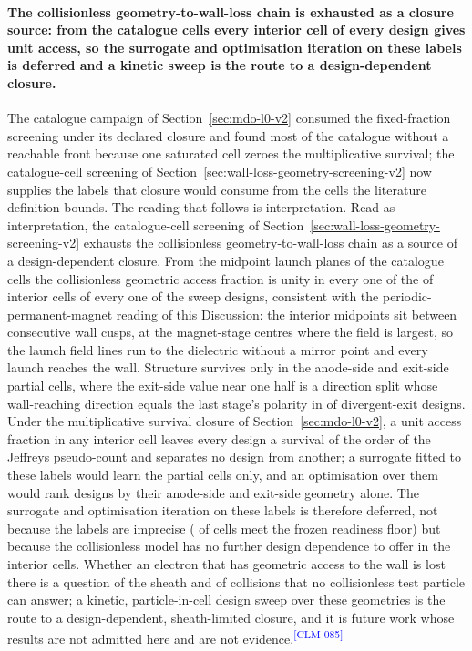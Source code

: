 \documentclass[11pt]{article}
\newcommand{\EvidenceClaim}[2]{#2\textsuperscript{\textcolor{blue}{[#1]}}}
\begin{document}
\paragraph{The collisionless geometry-to-wall-loss chain is exhausted as a
closure source: from the catalogue cells every interior cell of every design
gives unit access, so the surrogate and optimisation iteration on these labels is
deferred and a kinetic sweep is the route to a design-dependent closure.}
The catalogue campaign of Section~\ref{sec:mdo-l0-v2} consumed the fixed-fraction
screening under its declared closure and found most of the catalogue without a
reachable front because one saturated cell zeroes the multiplicative survival;
the catalogue-cell screening of Section~\ref{sec:wall-loss-geometry-screening-v2}
now supplies the labels that closure would consume from the cells the literature
definition bounds. The reading that follows is interpretation.
\EvidenceClaim{CLM-085}{Read as interpretation, the catalogue-cell screening of
Section~\ref{sec:wall-loss-geometry-screening-v2} exhausts the collisionless
geometry-to-wall-loss chain as a source of a design-dependent closure. From the
midpoint launch planes of the catalogue cells the collisionless geometric access
fraction is unity in every one of the \WlhInteriorAtOne{} of \WlhInteriorCells{}
interior cells of every one of the \WlhInteriorDesignsAllSaturated{} sweep designs,
consistent with the periodic-permanent-magnet reading of this Discussion: the
interior midpoints sit between consecutive wall cusps, at the magnet-stage centres
where the field is largest, so the launch field lines run to the dielectric
without a mirror point and every launch reaches the wall. Structure survives only
in the \WlhAnodeCells{} anode-side and \WlhExitCells{} exit-side partial cells, where
the exit-side value near one half is a direction split whose wall-reaching
direction equals the last stage's polarity in \WlhExitWallSideLastPolarity{} of
\WlhDivergentDesigns{} divergent-exit designs. Under the multiplicative survival
closure of Section~\ref{sec:mdo-l0-v2}, a unit access fraction in any interior cell
leaves every design a survival of the order of the Jeffreys pseudo-count and
separates no design from another; a surrogate fitted to these labels would learn
the partial cells only, and an optimisation over them would rank designs by their
anode-side and exit-side geometry alone. The surrogate and optimisation iteration
on these labels is therefore deferred, not because the labels are imprecise
(\WlhCellsReady{} of \WlhCellCount{} cells meet the frozen readiness floor) but
because the collisionless model has no further design dependence to offer in the
interior cells. Whether an electron that has geometric access to the wall is lost
there is a question of the sheath and of collisions that no collisionless test
particle can answer; a kinetic, particle-in-cell design sweep over these geometries
is the route to a design-dependent, sheath-limited closure, and it is future work
whose results are not admitted here and are not evidence.}
\end{document}
